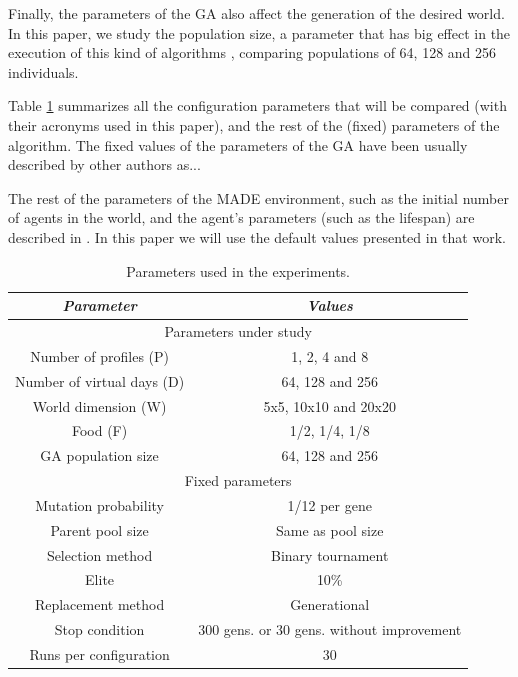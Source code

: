 \documentclass[runningheads,a4paper]{llncs}
\begin{document}
Finally, the parameters of the GA also affect the generation of the desired world. In this paper, we study the population size, a parameter that has big effect in the execution of this kind of algorithms \cite{}, comparing populations of 64, 128 and 256 individuals. %

Table \ref{tab:parameters} summarizes all the configuration parameters that will be compared (with their acronyms used in this paper), and the rest of the (fixed) parameters of the algorithm. The fixed values of the parameters of the GA have been usually described by other authors as...

The rest of the parameters of the MADE environment, such as the initial number of agents in the world, and the agent's parameters (such as the lifespan) are described in \cite{garcia14my}. In this paper we will use the default values presented in that work.

\begin{table}
\begin{center}
\begin{tabular}{|c|c|}
\hline
{\em Parameter} & {\em Values} \\\hline \hline
\multicolumn{2}{|c|}{Parameters under study} \\ \hline \hline
Number of profiles (P) & 1, 2, 4 and 8 \\\hline
Number of virtual days (D) &  64, 128 and 256 \\ \hline
World dimension (W) &  5x5, 10x10 and 20x20 \\ \hline
Food (F) & 1/2, 1/4, 1/8 \\ \hline
GA population size & 64, 128 and 256 \\ \hline
\multicolumn{2}{|c|}{Fixed parameters} \\ \hline \hline
Mutation probability & 1/12 per gene \\ \hline
Parent pool size & Same as pool size \\ \hline
Selection method & Binary tournament \\ \hline 
Elite & 10\%  \\ \hline
Replacement method & Generational\\ \hline
Stop condition & 300 gens. or 30 gens. without improvement \\ \hline %
Runs per configuration & 30 \\ \hline
\end{tabular}
\caption{Parameters used in the experiments.}
\label{tab:parameters}
\end{center}
\end{table}
\end{document}

